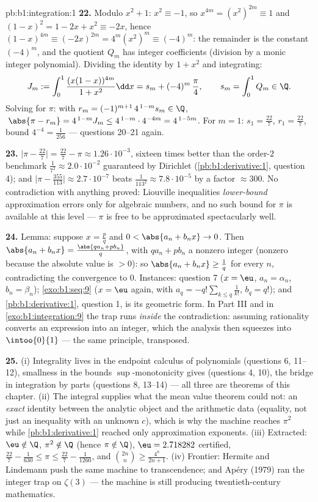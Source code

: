 \begin{solution}{pb:b1:integration:1}
\textbf{22.} Modulo $x^2 + 1$: $x^2 \equiv -1$, so $x^{4m} =
(x^2)^{2m} \equiv 1$ and $(1 - x)^2 = 1 - 2x + x^2 \equiv -2x$,
hence $(1-x)^{4m} \equiv (-2x)^{2m} = 4^m (x^2)^m \equiv
(-4)^m$: the remainder is the constant $(-4)^m$, and the
quotient $Q_m$ has integer coefficients (division by a monic
integer polynomial). Dividing the identity by $1 + x^2$ and
integrating:
\[
J_m := \int_0^1 \frac{(x(1-x))^{4m}}{1+x^2}\dd x
= s_m + (-4)^m\,\frac{\pi}{4},
\qquad s_m = \int_0^1 Q_m \in \Q .
\]
Solving for $\pi$: with $r_m = (-1)^{m+1}\,4^{\,1-m} s_m \in
\Q$, $\;\abs{\pi - r_m} = 4^{\,1-m} J_m \leq
4^{\,1-m}\cdot4^{-4m} = 4^{\,1-5m}$. For $m = 1$: $s_1 =
\frac{22}{7}$, $r_1 = \frac{22}{7}$, bound $4^{-4} =
\frac{1}{256}$ --- questions 20--21 again.

\textbf{23.} $\bigl|\pi - \frac{22}{7}\bigr| = \frac{22}{7} -
\pi \approx 1.26\cdot10^{-3}$, sixteen times better than the
order-$2$ benchmark $\frac{1}{7^2} \approx 2.0\cdot10^{-2}$
guaranteed by Dirichlet (\cref{pb:b1:derivative:1}, question 4);
and $\bigl|\pi - \frac{355}{113}\bigr| \approx 2.7\cdot10^{-7}$
beats $\frac{1}{113^2} \approx 7.8\cdot10^{-5}$ by a factor
$\approx 300$. No contradiction with anything proved: Liouville
inequalities \emph{lower-bound} approximation errors only for
algebraic numbers, and no such bound for $\pi$ is available at
this level --- $\pi$ is free to be approximated spectacularly
well.

\textbf{24.} Lemma: suppose $x = \frac pq$ and $0 < \abs{a_n +
b_n x} \to 0$. Then $\abs{a_n + b_n x} = \frac{\abs{q a_n + p
b_n}}{q}$, with $q a_n + p b_n$ a nonzero integer (nonzero
because the absolute value is $> 0$): so $\abs{a_n + b_n x}
\geq \frac1q$ for every $n$, contradicting the convergence to
$0$. Instances: question 7 ($x = \eu$, $a_n = \alpha_n$, $b_n =
\beta_n$); \cref{exo:b1:seq:9} ($x = \eu$ again, with $a_q =
-q!\sum_{k \leq q}\frac{1}{k!}$, $b_q = q!$); and
\cref{pb:b1:derivative:1}, question 1, is its geometric form.
In Part III and in \cref{exo:b1:integration:9} the trap runs
\emph{inside} the contradiction: assuming rationality converts
an expression into an integer, which the analysis then squeezes
into $\intoo{0}{1}$ --- the same principle, transposed.

\textbf{25.} (i) Integrality lives in the endpoint calculus of
polynomials (questions 6, 11--12), smallness in the bounds
$\sup$-monotonicity gives (questions 4, 10), the bridge in
integration by parts (questions 8, 13--14) --- all three are
theorems of this chapter. (ii) The integral supplies what the
mean value theorem could not: an \emph{exact} identity between
the analytic object and the arithmetic data (equality, not just
an inequality with an unknown $c$), which is why the machine
reaches $\pi^2$ while \cref{pb:b1:derivative:1} reached only
approximation exponents. (iii) Extracted: $\eu \notin \Q$,
$\pi^2 \notin \Q$ (hence $\pi \notin \Q$), $\eu = 2.718282$
certified, $\frac{22}{7} - \frac{1}{630} \leq \pi \leq
\frac{22}{7} - \frac{1}{1260}$, and $\binom{2n}{n} \geq
\frac{4^n}{2n+1}$. (iv) Frontier: Hermite and Lindemann push
the same machine to transcendence; and Ap\'ery (1979) ran the
integer trap on $\zeta(3)$ --- the machine is still producing
twentieth-century mathematics.
\end{solution}
